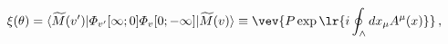 \begin{equation}
\xi ( \theta )
=
\langle \widetilde{M}(v') |
{\mit\Phi}_{v'} [ \infty ; 0 ] {\mit\Phi}_v [ 0 ; - \infty ]
| \widetilde{M}(v) \rangle
\equiv
\vev{P \exp\lr{i \oint_{\wedge} dx_\mu A^\mu(x)}}
\,,
\label{W}
\end{equation}


